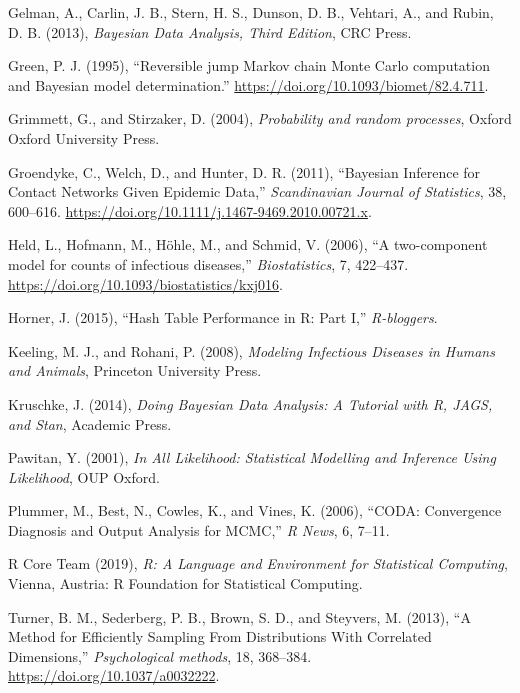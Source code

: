 \documentclass[11pt,a4paper]{article}
\numberwithin{equation}{section}
\begin{document}
\leavevmode\hypertarget{ref-gelman_bayesian_2013}{}%
Gelman, A., Carlin, J. B., Stern, H. S., Dunson, D. B., Vehtari, A., and
Rubin, D. B. (2013), \emph{Bayesian Data Analysis, Third Edition}, CRC
Press.

\leavevmode\hypertarget{ref-green_reversible_1995}{}%
Green, P. J. (1995), ``Reversible jump Markov chain Monte Carlo
computation and Bayesian model determination.''
\url{https://doi.org/10.1093/biomet/82.4.711}.

\leavevmode\hypertarget{ref-grimmett_probability_2004}{}%
Grimmett, G., and Stirzaker, D. (2004), \emph{Probability and random
processes}, Oxford Oxford University Press.

\leavevmode\hypertarget{ref-groendyke_bayesian_2011}{}%
Groendyke, C., Welch, D., and Hunter, D. R. (2011), ``Bayesian Inference
for Contact Networks Given Epidemic Data,'' \emph{Scandinavian Journal
of Statistics}, 38, 600--616.
\url{https://doi.org/10.1111/j.1467-9469.2010.00721.x}.

\leavevmode\hypertarget{ref-held_two-component_2006}{}%
Held, L., Hofmann, M., Höhle, M., and Schmid, V. (2006), ``A
two-component model for counts of infectious diseases,''
\emph{Biostatistics}, 7, 422--437.
\url{https://doi.org/10.1093/biostatistics/kxj016}.

\leavevmode\hypertarget{ref-horner_hash_2015}{}%
Horner, J. (2015), ``Hash Table Performance in R: Part I,''
\emph{R-bloggers}.

\leavevmode\hypertarget{ref-keeling_modeling_2008}{}%
Keeling, M. J., and Rohani, P. (2008), \emph{Modeling Infectious
Diseases in Humans and Animals}, Princeton University Press.

\leavevmode\hypertarget{ref-kruschke_doing_2014}{}%
Kruschke, J. (2014), \emph{Doing Bayesian Data Analysis: A Tutorial with
R, JAGS, and Stan}, Academic Press.

\leavevmode\hypertarget{ref-pawitan_all_2001}{}%
Pawitan, Y. (2001), \emph{In All Likelihood: Statistical Modelling and
Inference Using Likelihood}, OUP Oxford.

\leavevmode\hypertarget{ref-plummer_coda:_2006}{}%
Plummer, M., Best, N., Cowles, K., and Vines, K. (2006), ``CODA:
Convergence Diagnosis and Output Analysis for MCMC,'' \emph{R News}, 6,
7--11.

\leavevmode\hypertarget{ref-r_core_team_r:_2019}{}%
R Core Team (2019), \emph{R: A Language and Environment for Statistical
Computing}, Vienna, Austria: R Foundation for Statistical Computing.

\leavevmode\hypertarget{ref-turner_method_2013}{}%
Turner, B. M., Sederberg, P. B., Brown, S. D., and Steyvers, M. (2013),
``A Method for Efficiently Sampling From Distributions With Correlated
Dimensions,'' \emph{Psychological methods}, 18, 368--384.
\url{https://doi.org/10.1037/a0032222}.
\end{document}
